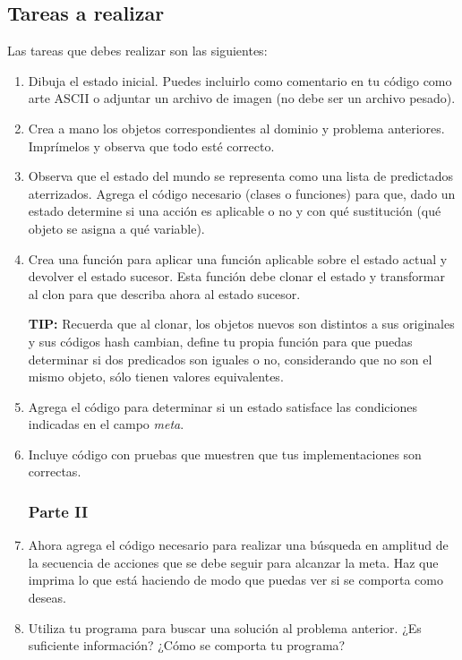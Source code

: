 \subsection{Tareas a realizar}

Las tareas que debes realizar son las siguientes:
\begin{enumerate}
\subsubsection{Parte I}
 \item Dibuja el estado inicial.  Puedes incluirlo como comentario en tu código como arte ASCII o adjuntar un archivo de imagen (no debe ser un archivo pesado).

 \item Crea a mano los objetos correspondientes al dominio y problema anteriores.
       Imprímelos y observa que todo esté correcto.

 \item Observa que el estado del mundo se representa como una lista de predictados aterrizados.
       Agrega el código necesario (clases o funciones) para que, dado un estado determine si una
       acción es aplicable o no y con qué sustitución (qué objeto se asigna a qué variable).

 \item Crea una función para aplicar una función aplicable sobre el estado actual y devolver el estado sucesor.  Esta función debe clonar el estado y transformar al clon para que describa ahora al estado sucesor.

 \textbf{TIP:}  Recuerda que al clonar, los objetos nuevos son distintos a sus originales y sus códigos hash cambian, define tu propia función para que puedas determinar si dos predicados son iguales o no, considerando que no son el mismo objeto, sólo tienen valores equivalentes.

 \item Agrega el código para determinar si un estado satisface las condiciones indicadas en el campo \emph{meta}.

 \item Incluye código con pruebas que muestren que tus implementaciones son correctas.
       
\subsubsection{Parte II}
 \item Ahora agrega el código necesario para realizar una búsqueda en amplitud de la secuencia
       de acciones que se debe seguir para alcanzar la meta.  Haz que imprima lo que está
       haciendo de modo que puedas ver si se comporta como deseas.
 \item Utiliza tu programa para buscar una solución al problema anterior.
       ¿Es suficiente información? ¿Cómo se comporta tu programa?
\end{enumerate}


